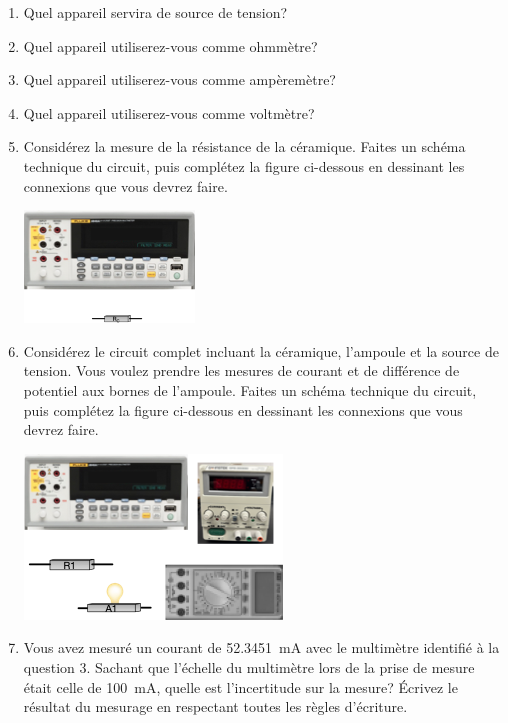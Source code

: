 \documentclass[letterpaper, DIV=11]{scrartcl}
\begin{document}
\begin{enumerate}
  \item Quel appareil servira de source de tension?
  \item Quel appareil utiliserez-vous comme ohmmètre?
  \item Quel appareil utiliserez-vous comme ampèremètre?
  \item Quel appareil utiliserez-vous comme voltmètre?
  \item Considérez la mesure de la résistance de la céramique. Faites un schéma
    technique du circuit, puis complétez la figure ci-dessous en dessinant les
    connexions que vous devrez faire.

    \begin{center}
    \includegraphics{figures/fluke_resistance_ceramique.png}
    \end{center}

  \item Considérez le circuit complet incluant la céramique, l'ampoule et la
    source de tension. Vous voulez prendre les mesures de courant et de
    différence de potentiel aux bornes de l'ampoule. Faites un schéma technique
    du circuit, puis complétez la figure ci-dessous en dessinant les connexions
    que vous devrez faire.

    \begin{center}
    \includegraphics{figures/circuit_complet.png}
    \end{center}

  \item Vous avez mesuré un courant de \qty{52.3451}{\milli\ampere} avec le
    multimètre identifié à la question 3. Sachant que l'échelle du multimètre
    lors de la prise de mesure était celle de \qty{100}{mA}, quelle est
    l'incertitude sur la mesure? Écrivez le résultat du mesurage en respectant
    toutes les règles d'écriture.
\end{enumerate}


\printbibliography
\end{document}
